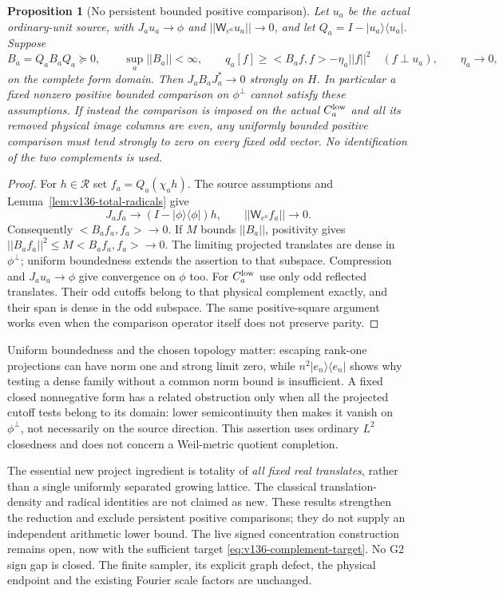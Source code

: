 \documentclass[11pt]{article}
\def\norm#1{||#1||}%
\def\ip#1#2{<#1,#2>}%
\newtheorem{proposition}[theorem]{Proposition}
\theoremstyle{remark}
\newcommand{\norm}[1]{\left\lVert #1\right\rVert}
\newcommand{\ip}[2]{\left\langle #1,#2\right\rangle}
\begin{document}
\begin{proposition}[No persistent bounded positive comparison]
\label{prop:v136-positive-comparison}
Let $u_a$ be the actual ordinary-unit source, with $J_au_a\to\phi$
and $\norm{\mathsf W_{e^a}u_a}\to0$, and let
$Q_a=I-|u_a\rangle\langle u_a|$. Suppose
\[
 B_a=Q_aB_aQ_a\succeq0,\qquad\sup_a\norm{B_a}<\infty,
 \qquad
 q_a[f]\ge\ip{B_af}{f}-\eta_a\norm f^2\quad(f\perp u_a),
 \qquad\eta_a\to0,
\]
on the complete form domain. Then
$J_aB_aJ_a^*\to0$ strongly on $H$.
In particular a fixed nonzero positive bounded comparison on
$\phi^\perp$ cannot satisfy these assumptions.
If instead the comparison is imposed on the actual $C_a^{\rm low}$
and all its removed physical image columns are even, any uniformly
bounded positive comparison must tend strongly to zero on every
fixed odd vector. No identification of the two complements is used.
\end{proposition}
\begin{proof}
For $h\in\mathcal R$ set $f_a=Q_a(\chi_a h)$. The source assumptions
and Lemma~\ref{lem:v136-total-radicals} give
\[
 J_af_a\longrightarrow(I-|\phi\rangle\langle\phi|)h,
 \qquad\norm{\mathsf W_{e^a}f_a}\longrightarrow0.
\]
Consequently $\ip{B_af_a}{f_a}\to0$. If $M$ bounds $\norm{B_a}$,
positivity gives $\norm{B_af_a}^2\le M\ip{B_af_a}{f_a}\to0$.
The limiting projected translates are dense in $\phi^\perp$;
uniform boundedness extends the assertion to that subspace.
Compression and $J_au_a\to\phi$ give convergence on $\phi$ too.
For $C_a^{\rm low}$ use only odd reflected translates. Their odd
cutoffs belong to that physical complement exactly, and their span
is dense in the odd subspace. The same positive-square argument works
even when the comparison operator itself does not preserve parity.
\end{proof}

Uniform boundedness and the chosen topology matter: escaping rank-one
projections can have norm one and strong limit zero, while
$n^2|e_n\rangle\langle e_n|$ shows why testing a dense family without
a common norm bound is insufficient. A fixed closed nonnegative form
has a related obstruction only when all the projected cutoff tests
belong to its domain: lower semicontinuity then makes it vanish on
$\phi^\perp$, not necessarily on the source direction. This assertion
uses ordinary $L^2$ closedness and does not concern a Weil-metric
quotient completion.

The essential new project ingredient is totality of \emph{all fixed real
translates}, rather than a single uniformly separated growing lattice.
The classical translation-density and radical identities are not claimed
as new. These results strengthen the reduction and exclude persistent
positive comparisons; they do not supply an independent arithmetic
lower bound. The live signed concentration construction remains open,
now with the sufficient target \eqref{eq:v136-complement-target}.
No G2 sign gap is closed. The finite sampler, its explicit graph defect,
the physical endpoint and the existing Fourier scale factors are unchanged.
\end{document}

